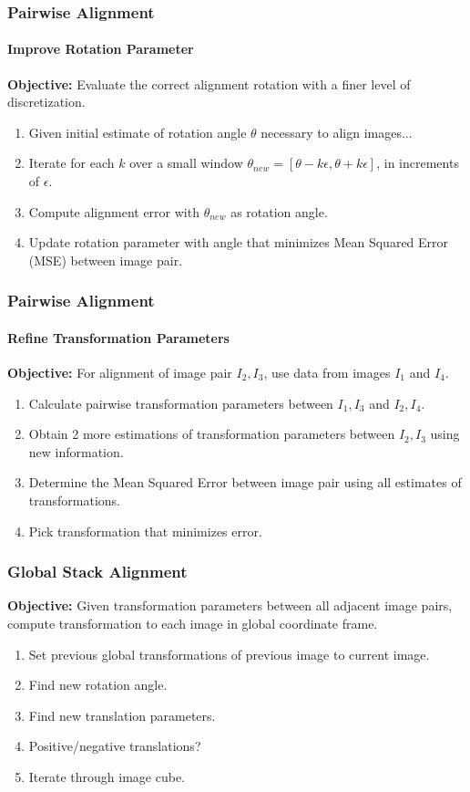 \documentclass{beamer}
\begin{document}
\begin{frame}
\frametitle{Pairwise Alignment}
\framesubtitle{Improve Rotation Parameter} 
\textbf{Objective:} Evaluate the correct alignment rotation with a finer level of discretization. 
\begin{enumerate}
\item Given initial estimate of rotation angle $\theta$ necessary to align images...
\item Iterate for each $k$ over a small window $\theta_{new} = [\theta-k\epsilon, \theta+k\epsilon]$, in increments of $\epsilon$.
\item Compute alignment error with $\theta_{new}$ as rotation angle.
\item Update rotation parameter with angle that minimizes Mean Squared Error (MSE) between image pair.
\end{enumerate}
\end{frame}

\begin{frame}
\frametitle{Pairwise Alignment}
\framesubtitle{Refine Transformation Parameters}
\textbf{Objective:} For alignment of image pair $I_2, I_3$, use data from images $I_1$ and $I_4$. \\
\begin{enumerate}
\item Calculate pairwise transformation parameters between $I_1,I_3$ and $I_2,I_4$.
\item Obtain 2 more estimations of transformation parameters between $I_2,I_3$ using new information.
\item Determine the Mean Squared Error between image pair using all estimates of transformations.
\item Pick transformation that minimizes error.
\end{enumerate}
\end{frame}

\begin{frame}
\frametitle{Global Stack Alignment}
\textbf{Objective:} Given transformation parameters between all adjacent image pairs, compute transformation to each image in global coordinate frame.
\begin{enumerate}
\item Set previous global transformations of previous image to current image. 
\item Find new rotation angle.
\item Find new translation parameters.
\item Positive/negative translations? 
\item Iterate through image cube. 
\end{enumerate}
\end{frame}
\end{document}
